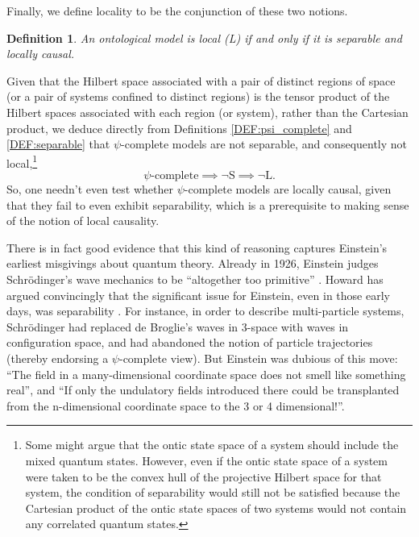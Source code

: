 \documentclass[aps,nofootinbib,12pt]{revtex4}
\newtheorem{definition}[theorem]{Definition}
\begin{document}
Finally, we define locality to be the conjunction of these two
notions.
\begin{definition}
An ontological model is \emph{local} (L) if and only if it is
separable and locally causal. \label{DEF:bell_local}
\end{definition}

Given that the Hilbert space associated with a pair of distinct
regions of space (or a pair of systems confined to distinct regions)
is the tensor product of the Hilbert spaces associated with each
region (or system), rather than the Cartesian product, we deduce
directly from Definitions \ref{DEF:psi_complete} and
\ref{DEF:separable} that $\psi$-complete models are not separable,
and consequently not local,\footnote{Some might argue that the ontic
state space of a system should include the mixed quantum states.
However, even if the ontic state space of a system were taken to be
the convex hull of the projective Hilbert space for that system, the
condition of separability would still not be satisfied because the
Cartesian product of the ontic state spaces of two systems would not
contain any correlated quantum states.}
\begin{equation}
\psi\text{-complete}\implies\lnot\text{S}\implies\lnot\text{L}.
\end{equation}
So, one needn't even test whether $\psi$-complete models are locally
causal, given that they fail to even exhibit separability, which is
a prerequisite to making sense of the notion of local causality.

There is in fact good evidence that this kind of reasoning captures
Einstein's earliest misgivings about quantum theory. Already in
1926, Einstein judges Schr\"{o}dinger's wave mechanics to be
``altogether too primitive'' \cite{Einstein_ehrenfest}. Howard has
argued convincingly that the significant issue for Einstein, even in
those early days, was separability \cite{Howard_einst_long}. For
instance, in order to describe multi-particle systems,
Schr\"{o}dinger had replaced de Broglie's waves in 3-space with
waves in configuration space, and had abandoned the notion of
particle trajectories (thereby endorsing a $\psi$-complete view).
But Einstein was dubious of this move: ``The field in a
many-dimensional coordinate space does not smell like something
real''\cite{Einstein_ehrenfest2}, and ``If only the undulatory
fields introduced there could be transplanted from the n-dimensional
coordinate space to the 3 or 4
dimensional!''\cite{Einstein_sommerfield}.
\end{document}

